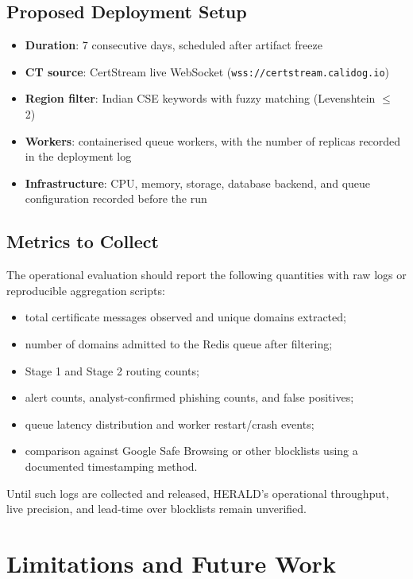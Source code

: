 \documentclass[conference]{IEEEtran}
\begin{document}
\subsection{Proposed Deployment Setup}

\begin{itemize}
    \item \textbf{Duration}: 7 consecutive days, scheduled after artifact freeze
    \item \textbf{CT source}: CertStream live WebSocket (\texttt{wss://certstream.calidog.io})~\cite{certstream}
    \item \textbf{Region filter}: Indian CSE keywords with fuzzy matching (Levenshtein $\leq$ 2)
    \item \textbf{Workers}: containerised queue workers, with the number of replicas recorded in the deployment log
    \item \textbf{Infrastructure}: CPU, memory, storage, database backend, and queue configuration recorded before the run
\end{itemize}

\subsection{Metrics to Collect}

The operational evaluation should report the following quantities with raw logs or reproducible aggregation scripts:

\begin{itemize}
    \item total certificate messages observed and unique domains extracted;
    \item number of domains admitted to the Redis queue after filtering;
    \item Stage 1 and Stage 2 routing counts;
    \item alert counts, analyst-confirmed phishing counts, and false positives;
    \item queue latency distribution and worker restart/crash events;
    \item comparison against Google Safe Browsing or other blocklists using a documented timestamping method.
\end{itemize}

Until such logs are collected and released, HERALD's operational throughput, live precision, and lead-time over blocklists remain unverified.

\section{Limitations and Future Work}
\end{document}
